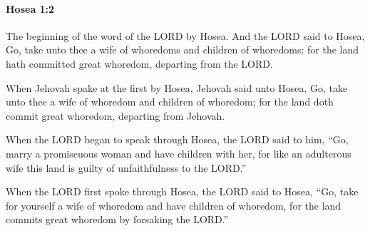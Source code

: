 		\paragraph{Hosea 1:2} %
			\label{HOSEA-1-2}

			The beginning of the word of the LORD by Hosea. And the LORD said to Hosea, Go, take unto thee a wife of whoredoms and children of whoredoms: for the land hath committed great whoredom, departing from the LORD.

			\begin{versebox}
					\item[BHS] 
					\item[LXX] 
					\item[ASV] When Jehovah spake at the first by Hosea, Jehovah said unto Hosea, Go, take unto thee a wife of whoredom and children of whoredom; for the land doth commit great whoredom, departing from Jehovah.
					\item[NIV] When the LORD began to speak through Hosea, the LORD said to him, “Go, marry a promiscuous woman and have children with her, for like an adulterous wife this land is guilty of unfaithfulness to the LORD.”
					\item[NRSV] When the LORD first spoke through Hosea, the LORD said to Hosea, “Go, take for yourself a wife of whoredom and have children of whoredom, for the land commits great whoredom by forsaking the LORD.”
			\end{versebox}

